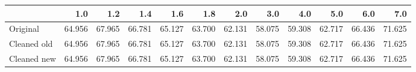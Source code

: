 \begin{tabular}{lrrrrrrrrrrr}
\toprule
{} &    1.0 &    1.2 &    1.4 &    1.6 &    1.8 &    2.0 &    3.0 &    4.0 &    5.0 &    6.0 &    7.0 \\
\midrule
Original    & 64.956 & 67.965 & 66.781 & 65.127 & 63.700 & 62.131 & 58.075 & 59.308 & 62.717 & 66.436 & 71.625 \\
Cleaned old & 64.956 & 67.965 & 66.781 & 65.127 & 63.700 & 62.131 & 58.075 & 59.308 & 62.717 & 66.436 & 71.625 \\
Cleaned new & 64.956 & 67.965 & 66.781 & 65.127 & 63.700 & 62.131 & 58.075 & 59.308 & 62.717 & 66.436 & 71.625 \\
\bottomrule
\end{tabular}
